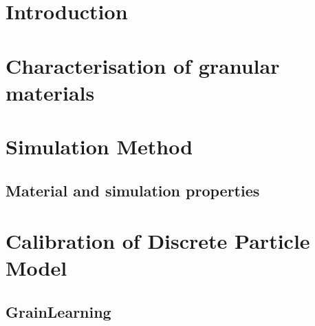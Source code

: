 \documentclass{article}
\begin{document}
\vspace*{\fill}
%
\pagebreak

\tableofcontents

\pagebreak

\section{Introduction}\label{section:Introduction}



% 


% 


\section{Characterisation of granular materials}





\section{Simulation Method}\label{section:ExpMethod}






\subsection{Material and simulation properties}\label{section:matprop}



\section{Calibration of Discrete Particle Model}\label{section:Calibration}
    
\subsection{GrainLearning}\label{section:GLtheory}

\end{document}
